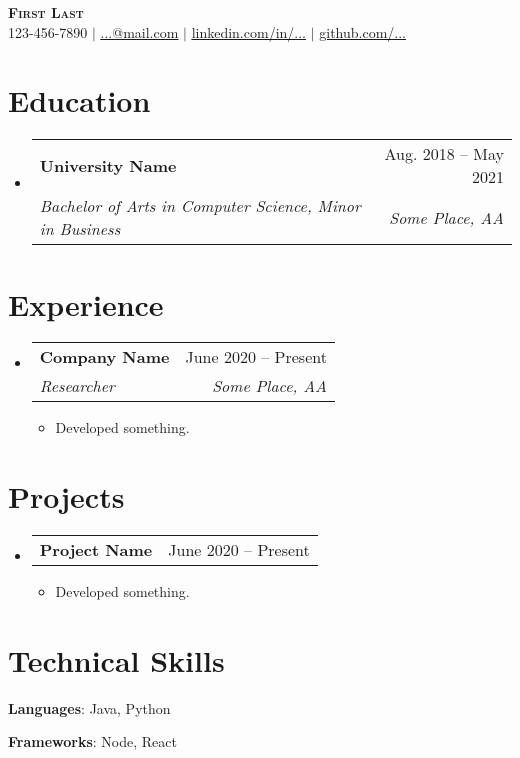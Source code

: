 \documentclass[letterpaper,12pt]{extarticle}
\makeatletter
\newcommand{\resumeItem}[1]{
  \item\normalsize{
      {#1 \vspace{-2pt}}
  }
}
\newcommand{\resumeSubheading}[4]{
  \vspace{-1pt}\item
  \begin{tabular*}{0.97\textwidth}[t]{l@{\extracolsep{\fill}}r}
  \textbf{#1} & \footnotesize #2 \\
  \textit{\normalsize #3} & \textit{\footnotesize #4} \\
  \end{tabular*}\vspace{-7pt}
}
\newcommand{\resumeProjectHeading}[2]{
  \item
  \begin{tabular*}{0.97\textwidth}{l@{\extracolsep{\fill}}r}
  \textbf{#1} & \normalsize #2 \\
  \end{tabular*}\vspace{-7pt}
}
\newcommand{\resumeSubHeadingListStart}{\begin{itemize}[leftmargin=0.15in, label={}]}
\newcommand{\resumeSubHeadingListEnd}{\end{itemize}}
\newcommand{\resumeItemListStart}{
\begin{itemize}
\itemsep 2pt
}
\newcommand{\resumeItemListEnd}{\end{itemize}\vspace{-5pt}}
\makeatother
\begin{document}
\begin{center}
\textbf{\Huge \scshape First Last} \\ \vspace{1pt}
\normalsize 123-456-7890 $|$ \href{mailto:x@x.com}{\underline{...@mail.com}} $|$
\href{https://linkedin.com/in/...}{\underline{linkedin.com/in/...}} $|$
\href{https://github.com/...}{\underline{github.com/...}}
\end{center}

\section{Education}
\resumeSubHeadingListStart
\resumeSubheading
{University Name}{Aug. 2018 -- May 2021}
{Bachelor of Arts in Computer Science, Minor in Business}{Some Place, AA}
\resumeSubHeadingListEnd

\section{Experience}
\resumeSubHeadingListStart
\resumeSubheading
{Company Name}{June 2020 -- Present}
{Researcher}{Some Place, AA}
\resumeItemListStart
\resumeItem{Developed something.}
\resumeItemListEnd
\resumeSubHeadingListEnd

\section{Projects}
\resumeSubHeadingListStart
\resumeProjectHeading
{\textbf{Project Name}}{June 2020 -- Present}
\resumeItemListStart
\resumeItem{Developed something.}
\resumeItemListEnd
\resumeSubHeadingListEnd

\section{Technical Skills}
\begin{itemize}[leftmargin=0.15in, label={}]
\itemsep -2pt
\normalsize{\item{
\textbf{Languages}{: Java, Python} \\
}}
\normalsize{\item{
\textbf{Frameworks}{: Node, React} \\
}}
\end{itemize}

\end{document}
